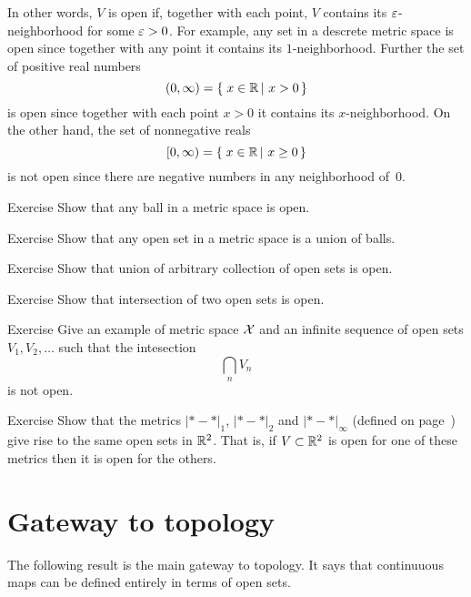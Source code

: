 In other words, $V$ is open if, together with each point, $V$ contains its $\varepsilon$-neighborhood for some $\varepsilon>0$.
For example, any set in a descrete metric space is open since together with any point it contains its $1$-neighborhood.
Further the set of positive real numbers
\[(0,\infty)=\set{x\in\RR}{x>0}\] 
is open since together with each point $x>0$ it contains its $x$-neighborhood.
On the other hand, the set of nonnegative reals 
\[[0,\infty)=\set{x\in\RR}{x\ge0}\]
is not open since there are negative numbers in any neighborhood of~$0$.

\begin{thm}{Exercise}\label{ex:ball-is-open}
Show that any ball in a metric space is open.
\end{thm}

\begin{thm}{Exercise}
Show that any  open set in a metric space is a union of balls. 
\end{thm}

\begin{thm}{Exercise}\label{ex:open-union} Show that union of arbitrary collection of open sets is open.
\end{thm}

\begin{thm}{Exercise}\label{ex:open-intersection}
Show that intersection of two open sets is open.
\end{thm}

\begin{thm}{Exercise}
Give an example of metric space $\mathcal{X}$ and an infinite sequence of open sets $V_1,V_2,\dots$
such that the intesection
\[\bigcap_nV_n\]
is not open.
\end{thm}

\begin{thm}{Exercise}\label{ex:d1+d2+dinfty-open}
Show that the metrics $|{*}-{*}|_1$, $|{*}-{*}|_2$ and $|{*}-{*}|_\infty$ (defined on page~\pageref{page:Metrics on the plane})
give rise to the same open sets in $\mathbb{R}^2$.
That is, if $V\subset \mathbb{R}^2$ is open for one of these metrics then it is open for the others.
\end{thm}

\section{Gateway to topology}

The following result is the main gateway to topology.
It says that continuuous maps can be defined entirely in terms of open sets.

